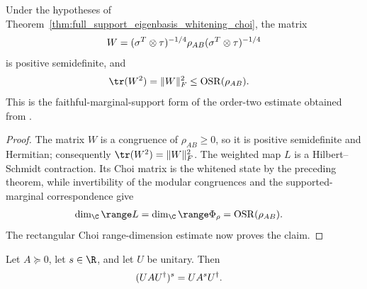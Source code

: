 \begin{theorem}
    \label{thm:full_support_eigenbasis_whitened_choi_bound}
    \leanok
    Under the hypotheses of
    Theorem~\ref{thm:full_support_eigenbasis_whitening_choi},
    the matrix
    \begin{align}
        W=(\sigma^T\otimes\tau)^{-1/4}\rho_{AB}
        (\sigma^T\otimes\tau)^{-1/4}
        \notag
    \end{align}
    is positive semidefinite, and
    \begin{align}
        \tr(W^2)=\|W\|_F^2
         & \leq \operatorname{OSR}(\rho_{AB}).
        \notag
    \end{align}
    This is the faithful-marginal-support form of the order-two estimate
    obtained from \cite[Theorem~6, Equation~(18)]{Beigi2013Sandwiched}.
\end{theorem}

\begin{proof}\leanok
    The matrix $W$ is a congruence of $\rho_{AB}\geq0$, so it is positive
    semidefinite and Hermitian; consequently
    $\tr(W^2)=\|W\|_F^2$.
    The weighted map $L$ is a Hilbert--Schmidt contraction.  Its Choi matrix
    is the whitened state by the preceding theorem, while invertibility of
    the modular congruences and the supported-marginal correspondence give
    \begin{align}
        \dim_{\C}\range L
         & =\dim_{\C}\range\Phi_\rho
        =\operatorname{OSR}(\rho_{AB}).
        \notag
    \end{align}
    The rectangular Choi range-dimension estimate now proves the claim.
\end{proof}

\begin{theorem}
    \label{thm:rpow_conj_unitary}
    \leanok
    Let $A\succeq0$, let $s\in\R$, and let $U$ be unitary. Then
    \begin{align}
        (UAU^\dagger)^s & =UA^sU^\dagger.
        \notag
    \end{align}
\end{theorem}

